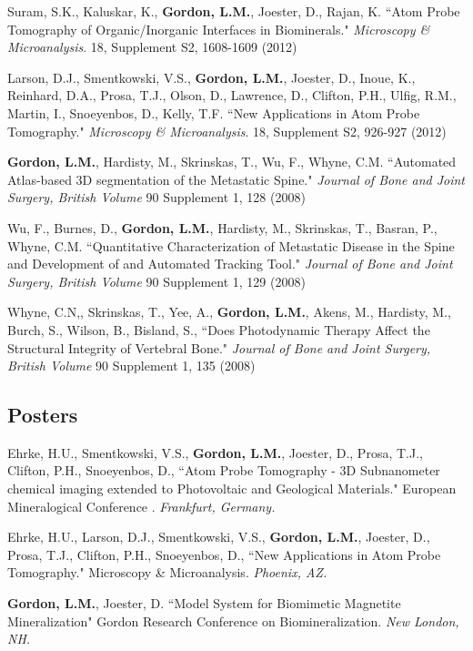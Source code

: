 \begingroup\setlength{\parskip}{0.15cm}
Suram, S.K., Kaluskar, K., \textbf{Gordon, L.M.}, Joester, D., Rajan, K. ``Atom Probe Tomography of Organic/Inorganic Interfaces in Biominerals." \emph{Microscopy \& Microanalysis}. 18, Supplement S2, 1608-1609 (2012)

Larson, D.J., Smentkowski, V.S., \textbf{Gordon, L.M.}, Joester, D., Inoue, K.,  Reinhard, D.A., Prosa, T.J., Olson, D., Lawrence, D., Clifton, P.H., Ulfig, R.M., Martin, I., Snoeyenbos, D., Kelly, T.F. ``New Applications in Atom Probe Tomography." \emph{Microscopy \& Microanalysis}. 18, Supplement S2, 926-927 (2012)

\textbf{Gordon, L.M.}, Hardisty, M., Skrinskas, T., Wu, F., Whyne, C.M. ``Automated Atlas-based 3D segmentation of the Metastatic Spine." \emph{Journal of Bone and Joint Surgery, British Volume} 90 Supplement 1, 128 (2008)

Wu, F., Burnes, D., \textbf{Gordon, L.M.}, Hardisty, M., Skrinskas, T., Basran, P., Whyne, C.M. ``Quantitative Characterization of Metastatic Disease in the Spine and Development of and Automated Tracking Tool."  \emph{Journal of Bone and Joint Surgery, British Volume} 90 Supplement 1, 129 (2008)

Whyne, C.N,, Skrinskas, T., Yee, A., \textbf{Gordon, L.M.}, Akens, M., Hardisty, M., Burch, S., Wilson, B., Bisland, S., ``Does Photodynamic Therapy Affect the Structural Integrity of Vertebral Bone." \emph{Journal of Bone and Joint Surgery, British Volume} 90 Supplement 1, 135 (2008)

\subsection*{Posters}
Ehrke, H.U., Smentkowski, V.S., \textbf{Gordon, L.M.}, Joester, D., Prosa, T.J., Clifton, P.H., Snoeyenbos, D., ``Atom Probe Tomography - 3D Subnanometer chemical imaging extended to Photovoltaic and Geological Materials." European Mineralogical Conference . \emph{Frankfurt, Germany.}

\begingroup\setlength{\parskip}{0.15cm}
Ehrke, H.U., Larson, D.J., Smentkowski, V.S., \textbf{Gordon, L.M.}, Joester, D., Prosa, T.J., Clifton, P.H., Snoeyenbos, D., ``New Applications in Atom Probe Tomography." Microscopy \& Microanalysis. \emph{Phoenix, AZ.}

\textbf{Gordon, L.M.}, Joester, D. ``Model System for Biomimetic Magnetite Mineralization" Gordon Research Conference on Biomineralization. \emph{New London, NH.}

